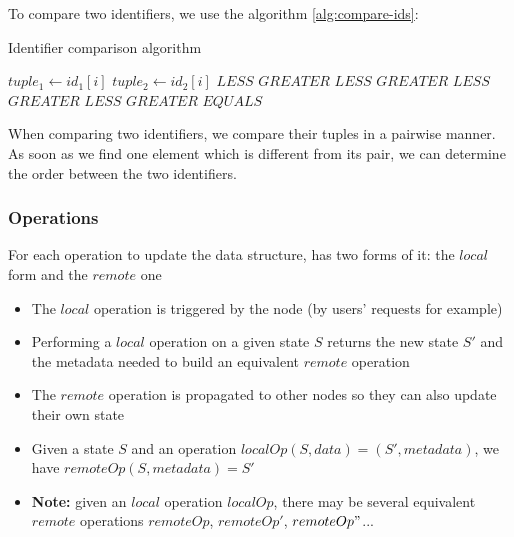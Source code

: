 \documentclass[a4paper]{article}
\begin{document}
To compare two identifiers, we use the algorithm \ref{alg:compare-ids}:

\begin{algorithm}
  \caption{Identifier comparison algorithm}\label{alg:compare-ids}
  \begin{algorithmic}
        \State $tuple_1 \gets id_1[i]$
        \State $tuple_2 \gets id_2[i]$
          \State \Return $LESS$
          \State \Return $GREATER$
          \State \Return $LESS$
          \State \Return $GREATER$
          \State \Return $LESS$
          \State \Return $GREATER$
        \EndIf
      \EndFor
        \State \Return $LESS$
        \State \Return $GREATER$
      \EndIf
      \State \Return $EQUALS$
    \EndFunction
  \end{algorithmic}
\end{algorithm}

When comparing two identifiers, we compare their tuples in a pairwise manner.
As soon as we find one element which is different from its pair,
we can determine the order between the two identifiers.

\subsubsection{Operations}

For each operation to update the data structure, has two forms of it: the $local$ form and the $remote$ one
\begin{itemize}
  \item The $local$ operation is triggered by the node (by users' requests for example)
  \item Performing a $local$ operation on a given state $S$
    returns the new state $S'$ and the metadata needed to build an equivalent $remote$ operation
  \item The $remote$ operation is propagated to other nodes so they can also update their own state
  \item Given a state $S$ and an operation $localOp(S, data) = (S', metadata)$, we have $remoteOp(S, metadata) = S'$
  \item \textbf{Note: } given an $local$ operation $localOp$, there may be several equivalent $remote$ operations $remoteOp$, $remoteOp'$, $remoteOp"$...
\end{itemize}
\end{document}
